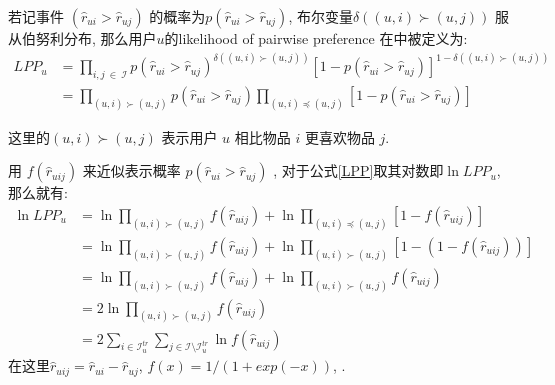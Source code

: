 若记事件 $\left(\hat{r}_{ui} > \hat{r}_{uj}\right)$ 的概率为$p\left(\hat{r}_{ui} > \hat{r}_{uj}\right)$, 布尔变量$\delta\left(\left(u,i\right) \succ \left(u,j\right)\right)$ 服从伯努利分布, 那么用户$u$的likelihood of pairwise preference 在\cite{rendle2009bpr}中被定义为:
\begin{equation}
\label{LPP}
\begin{aligned}
LPP_u  
&= \prod_{i,j \ \in \  \mathcal{I}}p\left(\hat{r}_{ui} > \hat{r}_{uj}\right)^{\delta\left(\left(u,i\right) \succ \left(u,j\right)\right)} \left[1-p\left(\hat{r}_{ui} > \hat{r}_{uj}\right)\right]^{1-\delta\left(\left(u,i\right) \succ \left(u,j\right)\right)}\\
&= \prod_{\left(u,i\right) \succ \left(u,j\right)}p\left(\hat{r}_{ui} > \hat{r}_{uj}\right)\prod_{\left(u,i\right) \preceq \left(u,j\right)}\left[1-p\left(\hat{r}_{ui} > \hat{r}_{uj}\right)\right]
\end{aligned}
\end{equation}

这里的$\left(u,i\right) \succ \left(u,j\right)$ 表示用户 $u$ 相比物品 $i$ 更喜欢物品 $j$.

用 $f \left(\hat{r}_{uij} \right)$ 来近似表示概率
$p\left(\hat{r}_{ui} > \hat{r}_{uj}\right)$ \cite{rendle2009bpr}, 对于公式\ref{LPP}取其对数即$\ln LPP_u$, 那么就有:
\begin{equation}
\label{eq5}
\begin{aligned}
\ln LPP_u
&= \ln \prod_{\left(u,i\right) \succ \left(u,j\right)} f \left(\hat{r}_{uij}\right) + \ln \prod_{\left(u,i\right) \preceq \left(u,j\right)}\left[1- f \left(\hat{r}_{uij}\right)\right]\\
&= \ln \prod_{\left(u,i\right) \succ \left(u,j\right)} f \left(\hat{r}_{uij}\right) + \ln \prod_{\left(u,i\right) \succ \left(u,j\right)}\left[1-\left(1- f \left(\hat{r}_{uij}\right)\right)\right]\\
&= \ln \prod_{\left(u,i\right) \succ \left(u,j\right)} f \left(\hat{r}_{uij}\right) + \ln \prod_{\left(u,i\right) \succ \left(u,j\right)} f \left(\hat{r}_{uij}\right)\\
&= 2\ln \prod_{\left(u,i\right) \succ \left(u,j\right)} f \left(\hat{r}_{uij}\right)\\
&= 2 \sum_{i\in\mathcal{I}_u^{tr}}
\sum_{j \in \mathcal{I}\setminus \mathcal{I}_u^{tr}}\ln f \left(\hat{r}_{uij}\right)
\end{aligned}
\end{equation}
在这里$\hat{r}_{uij} = \hat{r}_{ui} - \hat{r}_{uj}$, $f \left(x\right) = 1/\left(1+exp\left(-x\right)\right)$, .

